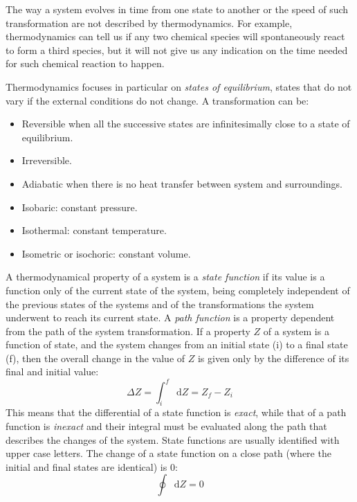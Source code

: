 \documentclass[12pt,a4paper]{report}
\newcommand*\diff{\mathop{}\!\mathrm{d}}
\begin{document}
   The way a system evolves in time from one state to another or the speed of such transformation are not described by thermodynamics. For example, thermodynamics can tell us if any two chemical species will spontaneously react to form a third species, but it will not give us any indication on the time needed for such chemical reaction to happen.
   
   Thermodynamics focuses in particular on \textit{states of equilibrium}, states that do not vary if the external conditions do not change.
   A transformation can be:
   \begin{itemize}
   \item Reversible when all the successive states are infinitesimally close to a state of equilibrium.
   \item Irreversible. 
   \item Adiabatic when there is no heat transfer between system and surroundings.
   \item Isobaric: constant pressure.
   \item Isothermal: constant temperature.
   \item Isometric or isochoric: constant volume.
   \end{itemize}

   A thermodynamical property of a system is a \textit{state function} if its value is a function only of the current state of the system, being completely independent of the previous states of the systems and of the transformations the system underwent to reach its current state. A \textit{path function} is a property dependent from the path of the system transformation.
   If a property $Z$ of a system is a function of state, and the system changes from an initial state (i) to a final state (f), then the overall change in the value of $Z$ is given only by the difference of its final and initial value: 
   \begin{equation*}
   \Delta Z = \int_{i}^{f}\diff Z = Z_{f}-Z_{i}
   \end{equation*}
This means that the differential of a state function is \textit{exact}, while that of a path function is \textit{inexact} and their integral must be evaluated along the path that describes the changes of the system. State functions are usually identified with upper case letters.
The change of a state function on a close path (where the initial and final states are identical) is 0:
   \begin{equation*}
   \oint\diff Z = 0
   \end{equation*}
\end{document}
